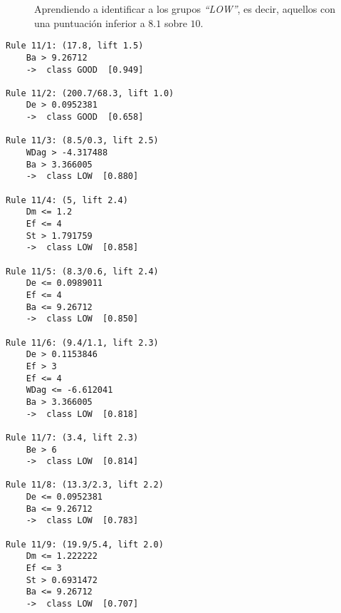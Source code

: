 \begin{figure}[H]
\centering
{}
\caption{Aprendiendo a identificar a los grupos \emph{``LOW''}, es decir, aquellos con una puntuación inferior a $8.1$ sobre $10$.}
\label{fig:cm2}
\end{figure}

\begin{tcolorbox}[title=Reglas de clasificación para identificar grupos de tipo \emph{``LOW''}.]
  \makeatletter
  \makeatother
\begin{multicols}{2}
    \begin{verbatim}
Rule 11/1: (17.8, lift 1.5)
	Ba > 9.26712
	->  class GOOD  [0.949]

Rule 11/2: (200.7/68.3, lift 1.0)
	De > 0.0952381
	->  class GOOD  [0.658]

Rule 11/3: (8.5/0.3, lift 2.5)
	WDag > -4.317488
	Ba > 3.366005
	->  class LOW  [0.880]

Rule 11/4: (5, lift 2.4)
	Dm <= 1.2
	Ef <= 4
	St > 1.791759
	->  class LOW  [0.858]

Rule 11/5: (8.3/0.6, lift 2.4)
	De <= 0.0989011
	Ef <= 4
	Ba <= 9.26712
	->  class LOW  [0.850]

Rule 11/6: (9.4/1.1, lift 2.3)
	De > 0.1153846
	Ef > 3
	Ef <= 4
	WDag <= -6.612041
	Ba > 3.366005
	->  class LOW  [0.818]

Rule 11/7: (3.4, lift 2.3)
	Be > 6
	->  class LOW  [0.814]

Rule 11/8: (13.3/2.3, lift 2.2)
	De <= 0.0952381
	Ba <= 9.26712
	->  class LOW  [0.783]

Rule 11/9: (19.9/5.4, lift 2.0)
	Dm <= 1.222222
	Ef <= 3
	St > 0.6931472
	Ba <= 9.26712
	->  class LOW  [0.707]
    \end{verbatim}
  \end{multicols}
\label{rules2}
\end{tcolorbox}

